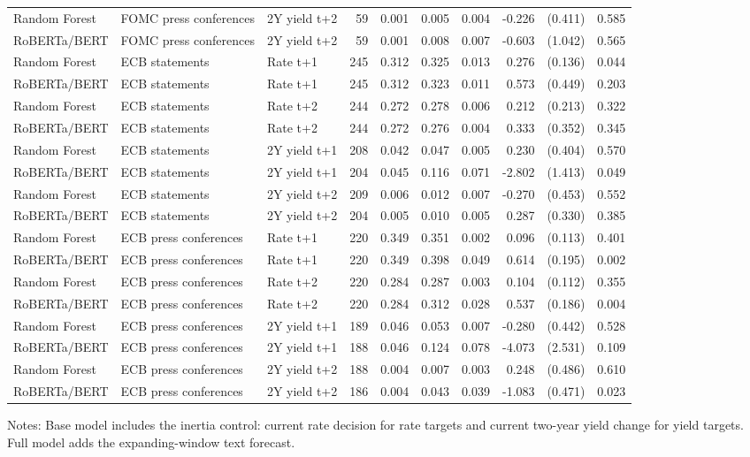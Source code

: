 \begin{table}[H]
\begin{threeparttable}
{\begin{tabular}{lllrrrrrrr}
Random Forest & FOMC press conferences & 2Y yield t+2 & 59 & 0.001 & 0.005 & 0.004 & -0.226 & (0.411) & 0.585 \\
RoBERTa\slash BERT & FOMC press conferences & 2Y yield t+2 & 59 & 0.001 & 0.008 & 0.007 & -0.603 & (1.042) & 0.565 \\
Random Forest & ECB statements & Rate t+1 & 245 & 0.312 & 0.325 & 0.013 & 0.276\sym{**} & (0.136) & 0.044 \\
RoBERTa\slash BERT & ECB statements & Rate t+1 & 245 & 0.312 & 0.323 & 0.011 & 0.573 & (0.449) & 0.203 \\
Random Forest & ECB statements & Rate t+2 & 244 & 0.272 & 0.278 & 0.006 & 0.212 & (0.213) & 0.322 \\
RoBERTa\slash BERT & ECB statements & Rate t+2 & 244 & 0.272 & 0.276 & 0.004 & 0.333 & (0.352) & 0.345 \\
Random Forest & ECB statements & 2Y yield t+1 & 208 & 0.042 & 0.047 & 0.005 & 0.230 & (0.404) & 0.570 \\
RoBERTa\slash BERT & ECB statements & 2Y yield t+1 & 204 & 0.045 & 0.116 & 0.071 & -2.802\sym{**} & (1.413) & 0.049 \\
Random Forest & ECB statements & 2Y yield t+2 & 209 & 0.006 & 0.012 & 0.007 & -0.270 & (0.453) & 0.552 \\
RoBERTa\slash BERT & ECB statements & 2Y yield t+2 & 204 & 0.005 & 0.010 & 0.005 & 0.287 & (0.330) & 0.385 \\
Random Forest & ECB press conferences & Rate t+1 & 220 & 0.349 & 0.351 & 0.002 & 0.096 & (0.113) & 0.401 \\
RoBERTa\slash BERT & ECB press conferences & Rate t+1 & 220 & 0.349 & 0.398 & 0.049 & 0.614\sym{***} & (0.195) & 0.002 \\
Random Forest & ECB press conferences & Rate t+2 & 220 & 0.284 & 0.287 & 0.003 & 0.104 & (0.112) & 0.355 \\
RoBERTa\slash BERT & ECB press conferences & Rate t+2 & 220 & 0.284 & 0.312 & 0.028 & 0.537\sym{***} & (0.186) & 0.004 \\
Random Forest & ECB press conferences & 2Y yield t+1 & 189 & 0.046 & 0.053 & 0.007 & -0.280 & (0.442) & 0.528 \\
RoBERTa\slash BERT & ECB press conferences & 2Y yield t+1 & 188 & 0.046 & 0.124 & 0.078 & -4.073 & (2.531) & 0.109 \\
Random Forest & ECB press conferences & 2Y yield t+2 & 188 & 0.004 & 0.007 & 0.003 & 0.248 & (0.486) & 0.610 \\
RoBERTa\slash BERT & ECB press conferences & 2Y yield t+2 & 186 & 0.004 & 0.043 & 0.039 & -1.083\sym{**} & (0.471) & 0.023 \\
\bottomrule
\end{tabular}
}
\begin{tablenotes}
\footnotesize
\item Notes: Base model includes the inertia control: current rate decision for rate targets and current two-year yield change for yield targets. Full model adds the expanding-window text forecast.
\end{tablenotes}
\end{threeparttable}
\end{table}
